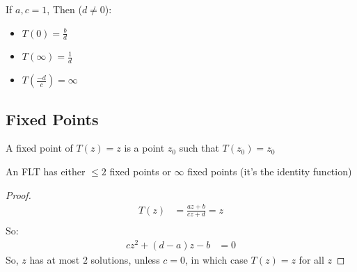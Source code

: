 \begin{example}
    If $a, c = 1$, Then ($d \neq 0$):
    \begin{itemize}
        \item $T(0) = \frac{b}{d}$
        \item $T(\infty) = \frac{1}{d}$
        \item $T(\frac{-d}{c}) = \infty$
    \end{itemize}
\end{example}

\subsection{Fixed Points}

\begin{definition}
    A fixed point of $T(z) = z$ is a point $z_0$ such that $T(z_0) = z_0$
\end{definition}

\begin{lemma}
    An FLT has either $\leq 2$ fixed points or $\infty$ fixed points (it's the identity function)
\end{lemma}
\begin{proof}
    \begin{align*}
        T(z) & = \frac{az + b}{cz + d} = z \\
    \end{align*}
    So:
    \begin{align*}
        cz^2 + (d - a)z - b & = 0
    \end{align*}
    So, $z$ has at most $2$ solutions, unless $c = 0$, in which case $T(z) = z$ for all $z$
\end{proof}

